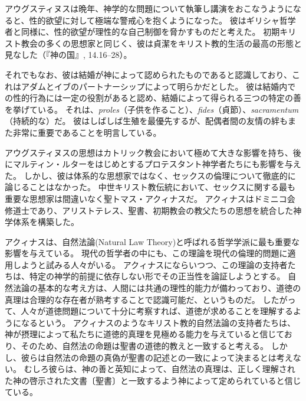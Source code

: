 \documentclass[paper=a4,book,openany]{jlreq} \usepackage{mystyle}
\begin{document}
アウグスティヌスは晩年、神学的な問題について執筆し講演をおこなうようになると、性的欲望に対して極端な警戒心を抱くようになった。
彼はギリシャ哲学者と同様に、性的欲望が理性的な自己制御を脅かすものだと考えた。
初期キリスト教会の多くの思想家と同じく、彼は貞潔をキリスト教的生活の最高の形態と見なした（『神の国』, 14.16--28）。

\nocite{augustine98:_city_god_pagan}
\nocite{アウグスティヌス82岩波}
\nocite{アウグスティヌス76:告白岩波}

それでもなお、彼は結婚が神によって認められたものであると認識しており、これはアダムとイブのパートナーシップによって明らかだとした。
彼は結婚内での性的行為には一定の役割があると認め、結婚によって得られる三つの特定の善を挙げている。
それは、\emph{proles}（子供を作ること）、\emph{fides}（貞節）、\emph{sacramentum}（持続的な）だ。
彼はしばしば生殖を最優先するが、配偶者間の友情の絆もまた非常に重要であることを明言している\citep{augustine98:_excel_marriag}。

アウグスティヌスの思想はカトリック教会において極めて大きな影響を持ち、後にマルティン・ルターをはじめとするプロテスタント神学者たちにも影響を与えた。
しかし、彼は体系的な思想家ではなく、セックスの倫理について徹底的に論じることはなかった。
中世キリスト教伝統において、セックスに関する最も重要な思想家は間違いなく聖トマス・アクィナスだ。
アクィナスはドミニコ会修道士であり、アリストテレス、聖書、初期教会の教父たちの思想を統合した神学体系を構築した。

アクィナスは、自然法論(Natural Law Theory)と呼ばれる哲学学派に最も重要な影響を与えている。
現代の哲学者の中にも、この理論を現代の倫理的問題に適用しようと試みる人々がいる。
アクィナスにならいつつ、この理論の支持者たちは、特定の神学的前提に依存しない形でその正当性を論証しようとする。
自然法論の基本的な考え方は、人間には共通の理性的能力が備わっており、道徳の真理は合理的な存在者が熟考することで認識可能だ、というものだ。
したがって、人々が道徳問題について十分に考察すれば、道徳が求めることを理解するようになるという。
アクィナスのようなキリスト教的自然法論の支持者たちは、神が摂理によって私たちに道徳的真理を見極める能力を与えていると信じており、そのため、自然法の命題は聖書の道徳的教えと一致すると考える。
しかし、彼らは自然法の命題の真偽が聖書の記述との一致によって決まるとは考えない。
むしろ彼らは、神の善と英知によって、自然法の真理は、正しく理解された神の啓示された文書〔聖書〕と一致するよう神によって定められていると信じている。
\end{document}
